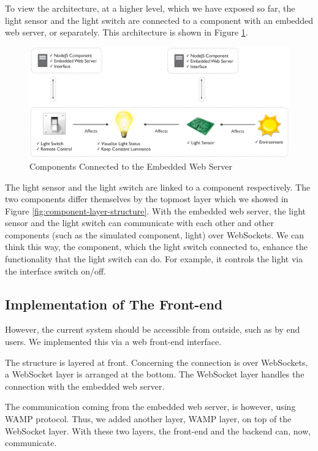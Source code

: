 To view the architecture, at a higher level, which we have exposed so far, the light sensor and the light switch are connected to a component with an embedded web server, or separately. This architecture is shown in Figure \ref{fig:component-nodeJS-interface}.

\begin{figure}[t]
  \begin{center}
    \includegraphics[width=1\textwidth]{images/component-nodeJS-interface.pdf}
    \caption{Components Connected to the Embedded Web Server}
    \label{fig:component-nodeJS-interface}
  \end{center}
\end{figure}

The light sensor and the light switch are linked to a component respectively. The two components differ themselves by the topmost layer which we showed in Figure \ref{fig:component-layer-structure}. With the embedded web server, the light sensor and the light switch can communicate with each other and other components (such as the simulated component, light) over WebSockets. We can think this way, the component, which the light switch connected to, enhance the functionality that the light switch can do. For example, it controls the light via the interface switch on/off. 

\subsection{Implementation of The Front-end}
However, the current system should be accessible from outside, such as by end users. We implemented this via a web front-end interface. 

The structure is layered at front. Concerning the connection is over WebSockets, a WebSocket layer is arranged at the bottom. The WebSocket layer handles the connection with the embedded web server. 

The communication coming from the embedded web server, is however, using WAMP protocol. Thus, we added another layer, WAMP layer, on top of the WebSocket layer. With these two layers, the front-end and the backend can, now, communicate.

